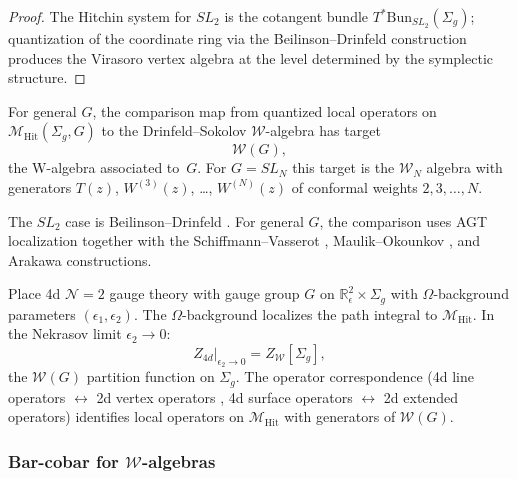 \begin{proof}
The Hitchin system for $SL_2$ is the cotangent bundle $T^*\mathrm{Bun}_{SL_2}(\Sigma_g)$; quantization of the coordinate ring via the Beilinson--Drinfeld construction \cite{BD04} produces the Virasoro vertex algebra at the level determined by the symplectic structure.
\end{proof}

\begin{remark}
\label{rem:w-algebra-hitchin}
For general $G$, the comparison map from quantized local operators on
$\mathcal{M}_{\mathrm{Hit}}(\Sigma_g, G)$ to the Drinfeld--Sokolov
$\mathcal{W}$-algebra has target
\[
\mathcal{W}(G),
\]
the W-algebra associated to~$G$. For $G = SL_N$ this target is the
$\mathcal{W}_N$ algebra with generators
$T(z)$, $W^{(3)}(z)$, \ldots, $W^{(N)}(z)$
of conformal weights $2, 3, \ldots, N$.
\end{remark}

\begin{remark}
The $SL_2$ case is Beilinson--Drinfeld \cite{BD04}. For general
$G$, the comparison uses AGT localization together with the
Schiffmann--Vasserot \cite{SV13}, Maulik--Okounkov \cite{MO19}, and
Arakawa \cite{Ara07} constructions.
\end{remark}

\begin{remark}
Place 4d $\mathcal{N}=2$ gauge theory with gauge group $G$ on $\mathbb{R}^2_\epsilon \times \Sigma_g$ with $\Omega$-background parameters $(\epsilon_1, \epsilon_2)$. The $\Omega$-background localizes the path integral to $\mathcal{M}_{\mathrm{Hit}}$. In the Nekrasov limit $\epsilon_2 \to 0$:
\[Z_{4d}|_{\epsilon_2 \to 0} = Z_{\mathcal{W}}[\Sigma_g],\]
the $\mathcal{W}(G)$ partition function on $\Sigma_g$. The operator correspondence (4d line operators $\leftrightarrow$ 2d vertex operators \cite{DNP25}, 4d surface operators $\leftrightarrow$ 2d extended operators) identifies local operators on $\mathcal{M}_{\mathrm{Hit}}$ with generators of $\mathcal{W}(G)$.
\end{remark}

\subsubsection{Bar-cobar for $\mathcal{W}$-algebras}

